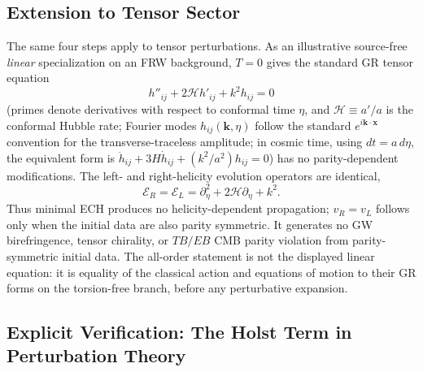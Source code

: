 \documentclass[aps,prd,twocolumn,superscriptaddress,showpacs,preprintnumbers,nofootinbib,longbibliography,floatfix]{revtex4-2}
\begin{document}
\subsection{Extension to Tensor Sector}

The same four steps apply to tensor perturbations.  As an illustrative
source-free \emph{linear} specialization on an FRW background, $T=0$ gives
the standard GR tensor equation
\begin{equation}
h''_{ij} + 2\mathcal{H}h'_{ij} + k^2 h_{ij} = 0
\end{equation}
(primes denote derivatives with respect to conformal time $\eta$, and
$\mathcal{H}\equiv a'/a$ is the conformal Hubble rate; Fourier modes
$h_{ij}(\mathbf{k},\eta)$ follow the standard
$e^{i\mathbf{k}\cdot\mathbf{x}}$ convention for the transverse-traceless
amplitude; in cosmic time, using $dt = a\,d\eta$, the
equivalent form is $\ddot h_{ij} + 3H\dot h_{ij} + (k^2/a^2)h_{ij}=0$)
has no parity-dependent modifications.  The left- and right-helicity
evolution operators are identical,
\begin{equation}
\mathcal E_R=\mathcal E_L=\partial_\eta^2+2\mathcal H\partial_\eta+k^2.
\end{equation}
Thus minimal ECH produces no helicity-dependent propagation; $v_R=v_L$ follows
only when the initial data are also parity symmetric.  It generates no GW
birefringence, tensor chirality, or $TB/EB$ CMB parity violation from
parity-symmetric initial data.
The all-order statement is not the displayed linear equation: it is equality
of the classical action and equations of motion to their GR forms on the
torsion-free branch, before any perturbative expansion.

\subsection{Explicit Verification: The Holst Term in Perturbation Theory}\label{sec:transp_holst}
\end{document}
